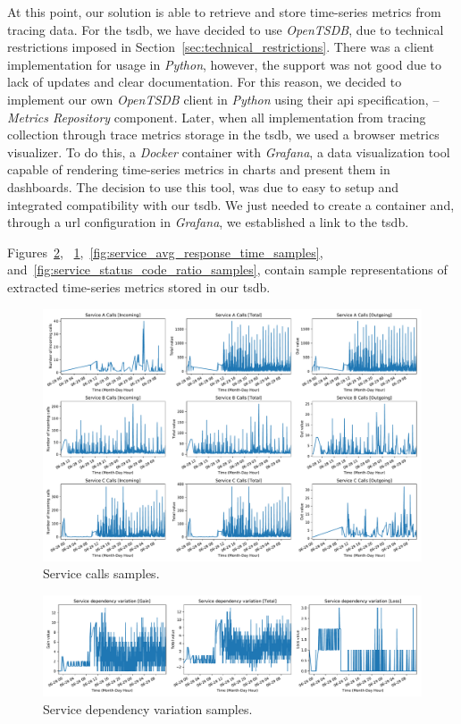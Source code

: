 At this point, our solution is able to retrieve and store time-series metrics from tracing data. For the \gls{tsdb}, we have decided to use \emph{OpenTSDB}, due to technical restrictions imposed in Section~\ref{sec:technical_restrictions}. There was a client implementation for usage in \emph{Python}, however, the support was not good due to lack of updates and clear documentation. For this reason, we decided to implement our own \emph{OpenTSDB} client in \emph{Python} using their \gls{api} specification, -- \emph{Metrics Repository} component. Later, when all implementation from tracing collection through trace metrics storage in the \gls{tsdb}, we used a browser metrics visualizer. To do this, a \emph{Docker} container with \emph{Grafana}, a data visualization tool capable of rendering time-series metrics in charts and present them in dashboards. The decision to use this tool, was due to easy to setup and integrated compatibility with our \gls{tsdb}. We just needed to create a container and, through a url configuration in \emph{Grafana}, we established a link to the \gls{tsdb}.

Figures~\ref{fig:service_dependency_variation}, ~\ref{fig:service_calls_samples},~\ref{fig:service_avg_response_time_samples}, and~\ref{fig:service_status_code_ratio_samples}, contain sample representations of extracted time-series metrics stored in our \gls{tsdb}.

\begin{figure}[H]
    \centering
    \includegraphics[width=1.00\textwidth]{images/service_calls.pdf}
    \caption{Service calls samples.}
    \label{fig:service_calls_samples}
\end{figure}

\begin{figure}[H]
    \centering
    \includegraphics[width=1.00\textwidth]{images/service_dependency_variation.pdf}
    \caption{Service dependency variation samples.}
    \label{fig:service_dependency_variation}
\end{figure}

